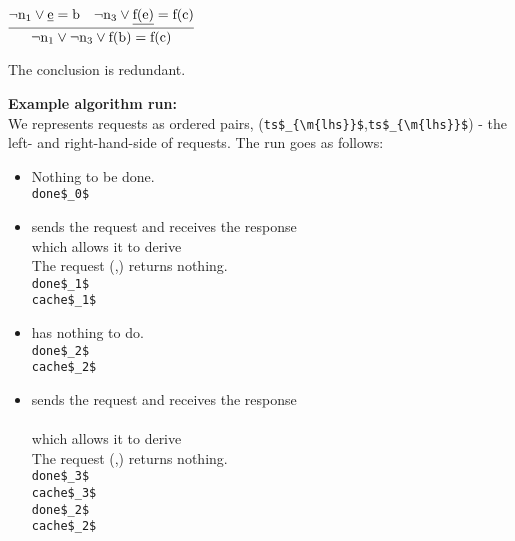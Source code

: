 \bigskip

\noindent
$\infer[]
{\m{\lnot n_1 \lor \lnot n_3 \lor f(b)=f(c)}}
{
	\m{\lnot n_1 \lor \underline{e}=b}
		&
	\m{\lnot n_3 \lor \underline{f(e)}=f(c)}
}
$

\noindent
The conclusion is redundant.

\bigskip

\noindent
\textbf{Example algorithm run:}\\
We represents requests as ordered pairs, (\lstinline|ts$_{\m{lhs}}$|,\lstinline|ts$_{\m{lhs}}$|) - the left- and right-hand-side of requests. The run goes as follows:
\begin{itemize}
\item {} Nothing to be done.\\
	\lstinline|done$_0$|
\item {} sends the request  and receives the response \\
which allows it to derive \\
The request (,) returns nothing.\\
	\lstinline|done$_1$|\\
	\lstinline|cache$_1$|
	
\item {} has nothing to do.\\
	\lstinline|done$_2$|\m{= \emptyset}\\
	\lstinline|cache$_2$|\m{= \emptyset}
	
\item {} sends the request  and receives the response \\
\\
which allows it to derive \\
The request (,) returns nothing.\\
	\lstinline|done$_3$|\\
	\lstinline|cache$_3$|\\
	\lstinline|done$_2$|\\
	\lstinline|cache$_2$|


\end{itemize}
